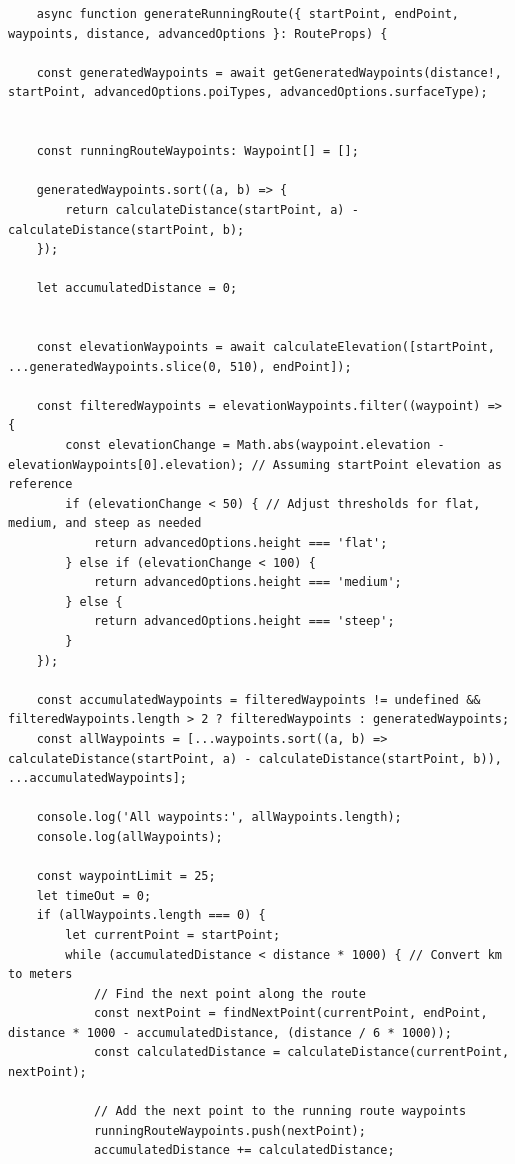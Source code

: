 \begin{lstlisting}
    async function generateRunningRoute({ startPoint, endPoint, waypoints, distance, advancedOptions }: RouteProps) {

    const generatedWaypoints = await getGeneratedWaypoints(distance!, startPoint, advancedOptions.poiTypes, advancedOptions.surfaceType);


    const runningRouteWaypoints: Waypoint[] = [];

    generatedWaypoints.sort((a, b) => {
        return calculateDistance(startPoint, a) - calculateDistance(startPoint, b);
    });

    let accumulatedDistance = 0;


    const elevationWaypoints = await calculateElevation([startPoint, ...generatedWaypoints.slice(0, 510), endPoint]);

    const filteredWaypoints = elevationWaypoints.filter((waypoint) => {
        const elevationChange = Math.abs(waypoint.elevation - elevationWaypoints[0].elevation); // Assuming startPoint elevation as reference
        if (elevationChange < 50) { // Adjust thresholds for flat, medium, and steep as needed
            return advancedOptions.height === 'flat';
        } else if (elevationChange < 100) {
            return advancedOptions.height === 'medium';
        } else {
            return advancedOptions.height === 'steep';
        }
    });

    const accumulatedWaypoints = filteredWaypoints != undefined && filteredWaypoints.length > 2 ? filteredWaypoints : generatedWaypoints;
    const allWaypoints = [...waypoints.sort((a, b) => calculateDistance(startPoint, a) - calculateDistance(startPoint, b)), ...accumulatedWaypoints];
    
    console.log('All waypoints:', allWaypoints.length);
    console.log(allWaypoints);
    
    const waypointLimit = 25;
    let timeOut = 0;
    if (allWaypoints.length === 0) {
        let currentPoint = startPoint;
        while (accumulatedDistance < distance * 1000) { // Convert km to meters
            // Find the next point along the route
            const nextPoint = findNextPoint(currentPoint, endPoint, distance * 1000 - accumulatedDistance, (distance / 6 * 1000));
            const calculatedDistance = calculateDistance(currentPoint, nextPoint);

            // Add the next point to the running route waypoints
            runningRouteWaypoints.push(nextPoint);
            accumulatedDistance += calculatedDistance;


\end{lstlisting}

